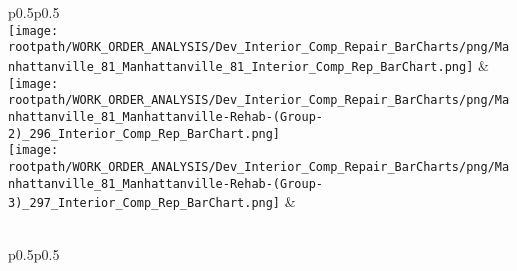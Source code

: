                         \begin{center}
                        \tablehead{\hspace{1cm}\\}
                        \tabletail{\hspace{1cm}\\}
                        \begin{supertabular}{p{0.5\textwidth}p{0.5\textwidth}}
                         \\
                        \texttt{[image: \\rootpath/WORK\_ORDER\_ANALYSIS/Dev\_Interior\_Comp\_Repair\_BarCharts/png/Manhattanville\_81\_Manhattanville\_81\_Interior\_Comp\_Rep\_BarChart.png]} & \texttt{[image: \\rootpath/WORK\_ORDER\_ANALYSIS/Dev\_Interior\_Comp\_Repair\_BarCharts/png/Manhattanville\_81\_Manhattanville-Rehab-(Group-2)\_296\_Interior\_Comp\_Rep\_BarChart.png]} \\
                                        \texttt{[image: \\rootpath/WORK\_ORDER\_ANALYSIS/Dev\_Interior\_Comp\_Repair\_BarCharts/png/Manhattanville\_81\_Manhattanville-Rehab-(Group-3)\_297\_Interior\_Comp\_Rep\_BarChart.png]} &  \hspace{1cm} \\
                                         \\
\end{supertabular}
\end{center}

                        \begin{center}
                        \tablehead{\hspace{1cm}\\}
                        \tabletail{\hspace{1cm}\\}
                        \begin{supertabular}{p{0.5\textwidth}p{0.5\textwidth}}
                         \\
                         \\
                                    \end{supertabular}
                                    \end{center}
                                    